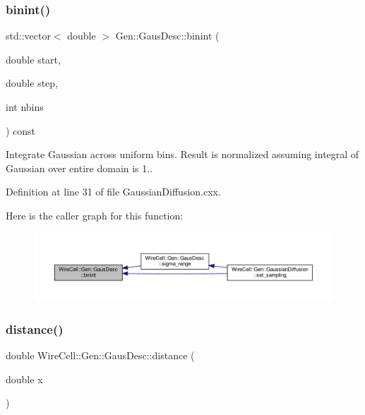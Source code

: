 \subsubsection{\texorpdfstring{binint()}{binint()}}
{\footnotesize\ttfamily std\+::vector$<$ double $>$ Gen\+::\+Gaus\+Desc\+::binint (\begin{DoxyParamCaption}\item[{double}]{start,  }\item[{double}]{step,  }\item[{int}]{nbins }\end{DoxyParamCaption}) const}

Integrate Gaussian across uniform bins. Result is normalized assuming integral of Gaussian over entire domain is 1.. 

Definition at line 31 of file Gaussian\+Diffusion.\+cxx.

Here is the caller graph for this function\+:
\nopagebreak
\begin{figure}[H]
\begin{center}
\leavevmode
\includegraphics[width=350pt]{struct_wire_cell_1_1_gen_1_1_gaus_desc_a1b437283fecc3cbfcdb616179381d666_icgraph}
\end{center}
\end{figure}
\mbox{\label{struct_wire_cell_1_1_gen_1_1_gaus_desc_a769c9958842435a1dba72113be6d8f09}} 
\subsubsection{\texorpdfstring{distance()}{distance()}}
{\footnotesize\ttfamily double Wire\+Cell\+::\+Gen\+::\+Gaus\+Desc\+::distance (\begin{DoxyParamCaption}\item[{double}]{x }\end{DoxyParamCaption})\hspace{0.3cm}{\ttfamily [inline]}}



